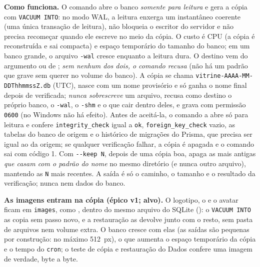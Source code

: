 \textbf{Como funciona.} O comando abre o banco \emph{somente para leitura} e gera a cópia com \texttt{VACUUM INTO}: no modo WAL, a leitura enxerga um instantâneo coerente (uma única transação de leitura), não bloqueia o escritor do servidor e não precisa recomeçar quando ele escreve no meio da cópia. O custo é CPU (a cópia é reconstruída e sai compacta) e espaço temporário do tamanho do banco; em um banco grande, o arquivo \texttt{-wal} cresce enquanto a leitura dura. O destino vem do argumento ou de ; \emph{sem nenhum dos dois, o comando recusa} (não há um padrão que grave sem querer no volume do banco). A cópia se chama \texttt{vitrine-AAAA-MM-DDThhmmssZ.db} (UTC), nasce com um nome provisório e só ganha o nome final depois de verificada; \emph{nunca sobrescreve} um arquivo, recusa como destino o próprio banco, o \texttt{-wal}, o \texttt{-shm} e o que cair dentro deles, e grava com permissão \texttt{0600} (no Windows não há efeito). Antes de aceitá-la, o comando a abre só para leitura e confere \texttt{integrity\_check} igual a \texttt{ok}, \texttt{foreign\_key\_check} vazio, as tabelas do banco de origem e o histórico de migrações do Prisma, que precisa ser igual ao da origem; se qualquer verificação falhar, a cópia é apagada e o comando sai com código 1. Com \texttt{-{}-keep N}, depois de uma cópia boa, apaga as mais antigas \emph{que casam com o padrão do nome} no mesmo diretório (e nunca outro arquivo), mantendo as \texttt{N} mais recentes. A saída é só o caminho, o tamanho e o resultado da verificação; nunca  nem dados do banco.

\textbf{As imagens entram na cópia (épico v1; alvo).} O logotipo, o  e o avatar ficam em \texttt{images}, como , dentro do mesmo arquivo do SQLite (): o \texttt{VACUUM INTO} as copia sem passo novo, e a restauração as devolve junto com o resto, sem pasta de arquivos nem volume extra. O banco cresce com elas (as saídas são pequenas por construção: no máximo 512~px), o que aumenta o espaço temporário da cópia e o tempo do \texttt{cron}; o teste de cópia e restauração do Dados confere uma imagem de verdade, byte a byte.

